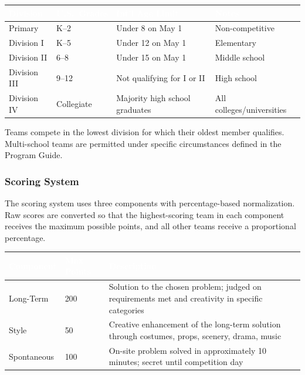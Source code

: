 \documentclass[11pt,letterpaper]{article}
\newcommand{\tableheader}[1]{\textbf{\sffamily\textcolor{white}{#1}}}
\begin{document}
\begin{center}
\begin{tabularx}{\textwidth}{L{2.5cm}L{3cm}L{4cm}X}
\toprule
{}
\tableheader{Division} & \tableheader{U.S.\ Grades} & \tableheader{Int'l Age Limit} & \tableheader{Notes} \\
\midrule
Primary & K--2 & Under 8 on May 1 & Non-competitive \\
Division I & K--5 & Under 12 on May 1 & Elementary \\
Division II & 6--8 & Under 15 on May 1 & Middle school \\
Division III & 9--12 & Not qualifying for I or II & High school \\
Division IV & Collegiate & Majority high school graduates & All colleges/universities \\
\bottomrule
\end{tabularx}
\end{center}

Teams compete in the lowest division for which their oldest member qualifies. Multi-school teams are permitted under specific circumstances defined in the Program Guide.

\subsubsection{Scoring System}

The scoring system uses three components with percentage-based normalization. Raw scores are converted so that the highest-scoring team in each component receives the maximum possible points, and all other teams receive a proportional percentage.

\begin{center}
\begin{tabularx}{\textwidth}{L{3cm}C{2cm}X}
\toprule
{}
\tableheader{Component} & \tableheader{Max Points} & \tableheader{Description} \\
\midrule
Long-Term & 200 & Solution to the chosen problem; judged on requirements met and creativity in specific categories \\
Style & 50 & Creative enhancement of the long-term solution through costumes, props, scenery, drama, music \\
Spontaneous & 100 & On-site problem solved in approximately 10 minutes; secret until competition day \\
\bottomrule
\end{tabularx}
\end{center}
\end{document}
